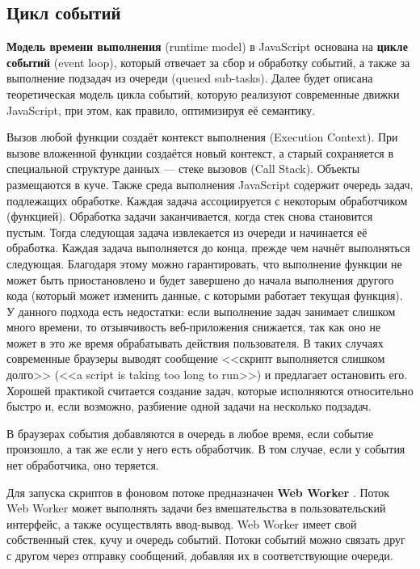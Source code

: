 \subsection{Цикл событий}

\textbf{Модель времени выполнения} (runtime model) в JavaScript основана на \textbf{цикле событий} (event loop), который отвечает за сбор и обработку событий, а также за выполнение подзадач из очереди (queued sub-tasks). Далее будет описана теоретическая модель цикла событий, которую реализуют современные движки JavaScript, при этом, как правило, оптимизируя её семантику. \cite{js_event_loop}

Вызов любой функции создаёт контекст выполнения (Execution Context). При вызове вложенной функции создаётся новый контекст, а старый сохраняется в специальной структуре данных --- стеке вызовов (Call Stack). Объекты размещаются в куче. Также среда выполнения JavaScript содержит очередь задач, подлежащих обработке. Каждая задача ассоциируется с некоторым обработчиком (функцией). Обработка задачи заканчивается, когда стек снова становится пустым. Тогда следующая задача извлекается из очереди и начинается её обработка. Каждая задача выполняется до конца, прежде чем начнёт выполняться следующая. Благодаря этому можно гарантировать, что выполнение функции не может быть приостановлено и будет завершено до начала выполнения другого кода (который может изменить данные, с которыми работает текущая функция). У данного подхода есть недостатки: если выполнение задач занимает слишком много времени, то отзывчивость веб-приложения снижается, так как оно не может в это же время обрабатывать действия пользователя. В таких случаях современные браузеры выводят сообщение <<скрипт выполняется слишком долго>> (<<a script is taking too long to run>>) и предлагает остановить его. Хорошей практикой считается создание задач, которые исполняются относительно быстро и, если возможно, разбиение одной задачи на несколько подзадач. \cite{js_event_loop}

В браузерах события добавляются в очередь в любое время, если событие произошло, а так же если у него есть обработчик. В том случае, если у события нет обработчика, оно теряется. \cite{js_event_loop}

Для запуска скриптов в фоновом потоке предназначен \textbf{Web Worker} \cite{js_web_workers}. Поток Web Worker может выполнять задачи без вмешательства в пользовательский интерфейс, а также осуществлять ввод-вывод. Web Worker имеет свой собственный стек, кучу и очередь событий. Потоки событий можно связать друг с другом через отправку сообщений, добавляя их в соответствующие очереди.~\cite{js_event_loop}

